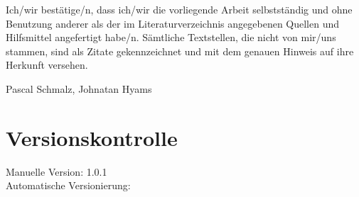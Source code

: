 \documentclass[11pt,titelpage]{scrartcl}
\begin{document}
Ich/wir bestätige/n, dass ich/wir die vorliegende Arbeit selbstständig und ohne Benutzung anderer als der im Literaturverzeichnis angegebenen Quellen und Hilfsmittel angefertigt habe/n. Sämtliche Textstellen, die nicht von mir/uns stammen, sind als Zitate gekennzeichnet und mit dem genauen Hinweis auf ihre Herkunft versehen.

Pascal Schmalz, Johnatan Hyams








\section{Versionskontrolle}
Manuelle Version: 1.0.1
\\

\noindent
Automatische Versionierung:
\immediate{}

\immediate{}
\end{document}
